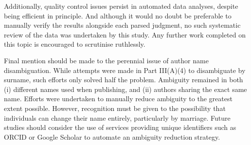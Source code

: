Additionally, quality control issues persist in automated data analyses, despite being efficient in principle. And although it would no doubt be preferable to manually verify the results alongside each parsed judgment, no such systematic review of the data was undertaken by this study. Any further work completed on this topic is encouraged to scrutinise ruthlessly.

Final mention should be made to the perennial issue of author name disambiguation. While attempts were made in Part III(A)(4) to disambiguate by surname, such efforts only solved half the problem. Ambiguity remained in both (i) different names used when publishing, and (ii) authors sharing the exact same name. Efforts were undertaken to manually reduce ambiguity to the greatest extent possible. However, recognition must be given to the possibility that individuals can change their name entirely, particularly by marriage. Future studies should consider the use of services providing unique identifiers such as ORCID or Google Scholar to automate an ambiguity reduction strategy.

